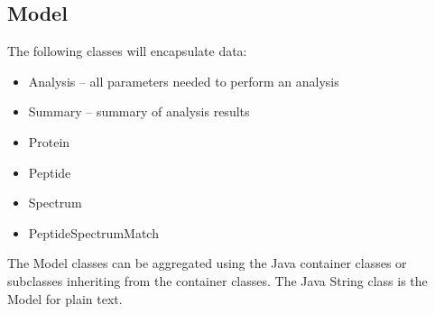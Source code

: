 \documentclass{article}
\begin{document}
\subsection{Model}

The following classes will encapsulate data:

\begin{itemize}
\item Analysis -- all parameters needed to perform an analysis
\item Summary -- summary of analysis results
\item Protein
\item Peptide
\item Spectrum
\item PeptideSpectrumMatch
\end{itemize}

The Model classes can be aggregated using the Java container classes or subclasses
inheriting from the container classes. The Java String class is the Model for
plain text.
\end{document}
